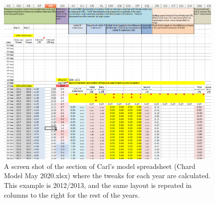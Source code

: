 \documentclass[11pt,letter]{article}
\begin{document}
\begin{figure}[H]
  \includegraphics[width=\linewidth]{201213Calculation.png}
  \caption{A screen shot of the section of Carl's model spreadsheet  (Chard Model May 2020.xlsx) where the tweaks for each year are calculated. This example is 2012/2013, and the same layout is repeated in columns to the right for the rest of the years.}
  \label{fig:201213Calculation}
\end{figure}



\end{document}
